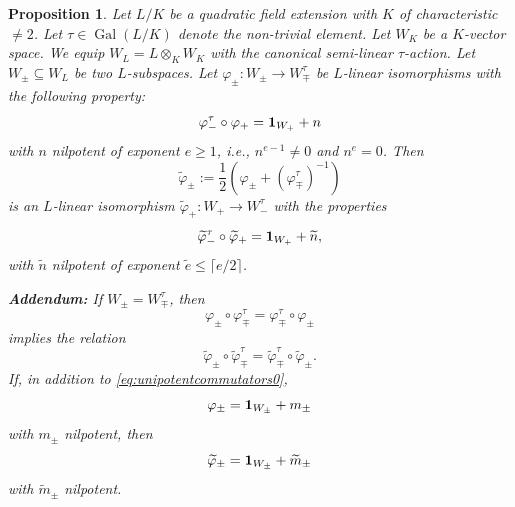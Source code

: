 \documentclass[a4paper,12pt,reqno]{amsart}
\DeclareMathOperator{\Gal}{\mathrm {Gal}}
\theoremstyle{plain}
\newtheorem{proposition}[theorem]{Proposition}
\theoremstyle{remark}
\begin{document}
    \begin{proposition}\label{prop:unipotentstabilization}
      Let $L/K$ be a quadratic field extension with $K$ of characteristic $\neq 2$. Let $\tau\in\Gal(L/K)$ denote the non-trivial element. Let $W_K$ be a $K$-vector space. We equip $W_L = L \otimes_K W_K$ with the canonical semi-linear $\tau$-action. Let $W_\pm \subseteq W_L$ be two $L$-subspaces. Let $\varphi_\pm \colon W_\pm \to W_\mp^\tau$ be $L$-linear isomorphisms with the following property:
      \begin{equation}
        \varphi_-^\tau\circ\varphi_+ = {\bf1}_{W_+} + n
        \label{eq:nilpotency}
      \end{equation}
      with $n$ nilpotent of exponent $e \ge 1$, i.e., $n^{e-1} \neq 0$ and $n^e = 0$.
      Then
      \begin{equation}
        \widetilde{\varphi}_\pm := \frac{1}{2}\left(\varphi_\pm + \left(\varphi_\mp^\tau\right)^{-1}\right)
        \label{eq:unipotentstabilizationiteration}
      \end{equation}
      is an $L$-linear isomorphism $\widetilde{\varphi}_+ \colon W_+ \to W_-^\tau$ with the properties
      \begin{equation}
        \widetilde{\varphi}_-^\tau \circ \widetilde{\varphi}_+ = {\bf1}_{W_+} + \widetilde{n},
        \label{eq:nilpotencytilde}
      \end{equation}
      with $\widetilde{n}$ nilpotent of exponent $\widetilde{e} \le \lceil e/2 \rceil$.

      \noindent\textbf{Addendum:} If $W_\pm = W_\mp^\tau$, then
      \begin{equation}
      \varphi_\pm\circ\varphi_\mp^\tau = \varphi_\mp^\tau\circ\varphi_{\pm}
        \label{eq:unipotentcommutators0}
      \end{equation}
      implies the relation
      \begin{equation}
        \widetilde{\varphi}_\pm \circ \widetilde{\varphi}_\mp^\tau = \widetilde{\varphi}_\mp^\tau \circ \widetilde{\varphi}_{\pm}.
        \label{eq:unipotentcommutators1}
      \end{equation}
      If, in addition to \eqref{eq:unipotentcommutators0},
      \begin{equation}
        \varphi_{\pm} = {\bf1}_{W_\pm} + m_\pm
        \label{eq:unipotentnilpotency0}
      \end{equation}
      with $m_\pm$ nilpotent, then
      \begin{equation}
        \widetilde{\varphi}_{\pm} = {\bf1}_{W_\pm} + \widetilde{m}_\pm
        \label{eq:unipotentnilpotency1}
      \end{equation}
      with $\widetilde{m}_\pm$ nilpotent.
    \end{proposition}
\end{document}
